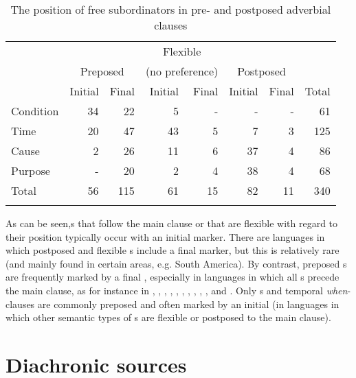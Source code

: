 \documentclass[output=paper]{langsci/langscibook}
\begin{document}
\begin{table}
\begin{tabularx}{\textwidth}{X rr  rr rr  r}
\lsptoprule
& & & \multicolumn{2}{c}{Flexible}\\
& \multicolumn{2}{c}{Preposed} &  \multicolumn{2}{c}{(no preference)} &  \multicolumn{2}{c}{Postposed} \\
\cmidrule(lr){2-3}\cmidrule(lr){4-5}\cmidrule(lr){6-7}
&   Initial &   Final &   Initial &   Final &   Initial &   Final & Total\\
\midrule
{Condition} 	& 34 	& 22 	& 5 	& - 	& - 	& - 	& 61\\
{Time} 		& 20 	& 47 	& 43 	& 5 	& 7 	& 3 	& 125\\
{Cause} 	& 2 	& 26 	& 11 	& 6 	& 37 	& 4 	& 86\\
{Purpose} 	& - 	& 20 	& 2 	& 4 	& 38 	& 4 	& 68\\
\midrule
{Total} 	& 56 	& 115 	& 61 	& 15 	& 82 	& 11 	& 340\\
\lspbottomrule
\end{tabularx}

\caption{The position of free subordinators in pre- and postposed adverbial clauses}
\label{tab:diessel:3}
\end{table}
\largerpage
As can be seen,s that follow the main clause or that are flexible with regard to their position typically occur with an initial marker. There are languages in which postposed and flexible s include a final marker, but this is relatively rare (and mainly found in certain areas, e.g. South America). By contrast, preposed s are frequently marked by a final , especially in languages in which all s precede the main clause, as for instance in , , , , , , , , , , and . Only s and temporal \textit{when}-clauses are commonly preposed and often marked by an initial  (in languages in which other semantic types of s \largerpage are flexible or postposed to the main clause). 


\section{Diachronic sources}\label{sec:diessel:3}
\end{document}

